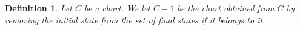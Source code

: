 \documentclass{article}
\newtheorem{definition}{Definition}[section]
\newtheorem{lemma}[definition]{Lemma}
\begin{document}






\begin{definition}
  Let $C$ be a chart. We let $C-1$ be the chart obtained from $C$ by removing the initial state 
  from the set of final states if it belongs to it.
\end{definition}
\end{document}
